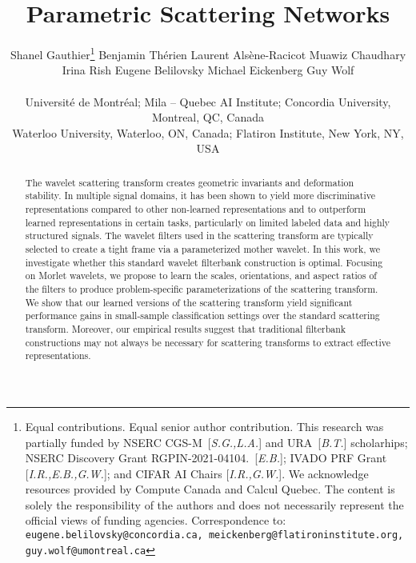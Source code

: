 \documentclass[10pt,twocolumn,letterpaper]{article}
\begin{document}
\title{Parametric Scattering Networks}



\author{\parbox{\textwidth}{\centering
    Shanel Gauthier\thanks{Equal contributions. Equal senior author contribution. This research was partially funded by NSERC CGS-M~[\emph{S.G.,L.A.}] and URA~[\emph{B.T.}] scholarhips; NSERC Discovery Grant RGPIN-2021-04104.~[\emph{E.B.}]; IVADO PRF Grant [\emph{I.R.,E.B.,G.W.}]; and CIFAR AI Chairs [\emph{I.R.,G.W.}]. We acknowledge resources provided by Compute Canada and Calcul Quebec. The content is solely the responsibility of the authors and does not necessarily represent the official views of funding agencies. Correspondence to: \texttt{eugene.belilovsky@concordia.ca, meickenberg@flatironinstitute.org, guy.wolf@umontreal.ca}} \hspace{-10pt}
    \qquad Benjamin Th\'{e}rien \hspace{-10pt}
    \qquad Laurent Als\`{e}ne-Racicot \hspace{-10pt}
    \qquad Muawiz Chaudhary \\
    Irina Rish
    \qquad Eugene Belilovsky
    \qquad Michael Eickenberg 
    \qquad Guy Wolf} \vspace{5pt}\\
 Universit\'{e} de Montr\'{e}al;  Mila -- Quebec AI Institute;  Concordia University, Montreal, QC, Canada \\
Waterloo University, Waterloo, ON, Canada; Flatiron Institute, New York, NY, USA\\ 
}



\maketitle
\begin{abstract}\vspace{-4pt}
   The wavelet scattering transform creates geometric invariants and deformation stability. In multiple signal domains, it has been shown to yield more discriminative representations compared to other non-learned representations and to outperform learned representations in certain tasks, particularly on limited labeled data and highly structured signals. The wavelet filters used in the scattering transform are typically selected to create a tight frame via a parameterized mother wavelet. In this work, we investigate whether this standard wavelet filterbank construction is optimal. Focusing on Morlet wavelets, we propose to learn the scales, orientations, and aspect ratios of the filters to produce problem-specific parameterizations of the scattering transform. We show that our learned versions of the scattering transform yield significant performance gains in small-sample classification settings over the standard scattering transform. Moreover, our empirical results suggest that traditional filterbank constructions may not always be necessary for scattering transforms to extract effective representations.
\end{abstract}
\vspace{-12pt}
\end{document}
